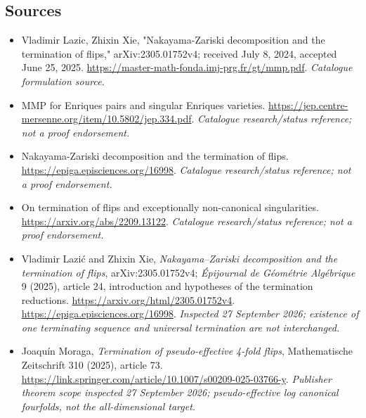 \documentclass[11pt,a4paper]{article}
\numberwithin{equation}{section}
\begin{document}
\needspace{170mm}
\subsection{Sources}
\begin{itemize}\raggedright
\item[\textnormal{[S1]}]\hypertarget{source:30006709:1}{} Vladimir Lazic, Zhixin Xie, "Nakayama-Zariski decomposition and the termination of flips," arXiv:2305.01752v4; received July 8, 2024, accepted June 25, 2025.
\url{https://master-math-fonda.imj-prg.fr/gt/mmp.pdf}.
{\small\textit{Catalogue formulation source.}}
\item[\textnormal{[S2]}]\hypertarget{source:30006709:2}{} MMP for Enriques pairs and singular Enriques varieties.
\url{https://jep.centre-mersenne.org/item/10.5802/jep.334.pdf}.
{\small\textit{Catalogue research/status reference; not a proof endorsement.}}
\item[\textnormal{[S3]}]\hypertarget{source:30006709:3}{} Nakayama-Zariski decomposition and the termination of flips.
\url{https://epiga.episciences.org/16998}.
{\small\textit{Catalogue research/status reference; not a proof endorsement.}}
\item[\textnormal{[S4]}]\hypertarget{source:30006709:4}{} On termination of flips and exceptionally non-canonical singularities.
\url{https://arxiv.org/abs/2209.13122}.
{\small\textit{Catalogue research/status reference; not a proof endorsement.}}
\item[\textnormal{[E1]}]\hypertarget{extra:30006709:1}{} Vladimir Lazi\'c and
Zhixin Xie, \emph{Nakayama--Zariski decomposition and the termination of flips},
arXiv:2305.01752v4; \emph{\'Epijournal de G\'eom\'etrie Alg\'ebrique} 9 (2025),
article 24, introduction and hypotheses of the termination reductions.
\url{https://arxiv.org/html/2305.01752v4}.
\url{https://epiga.episciences.org/16998}.
{\small\textit{Inspected 27 September 2026; existence of one terminating
sequence and universal termination are not interchanged.}}
\item[\textnormal{[E2]}]\hypertarget{extra:30006709:2}{} Joaqu\'in Moraga,
\emph{Termination of pseudo-effective 4-fold flips},
Mathematische Zeitschrift 310 (2025), article 73.
\url{https://link.springer.com/article/10.1007/s00209-025-03766-y}.
{\small\textit{Publisher theorem scope inspected 27 September 2026;
pseudo-effective log canonical fourfolds, not the all-dimensional target.}}
\end{itemize}
\end{document}
